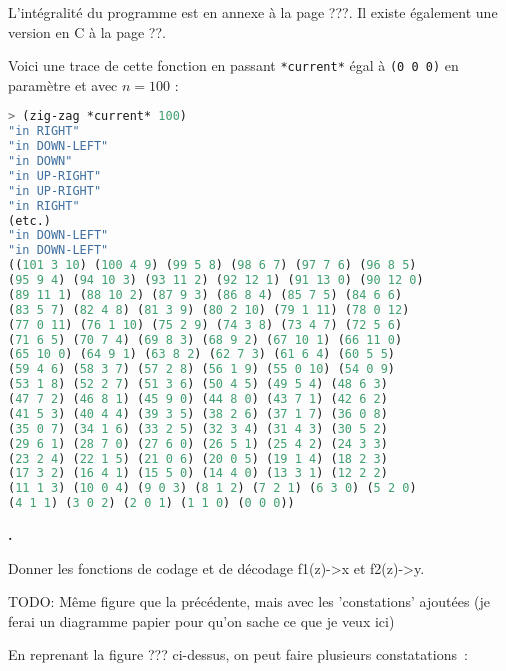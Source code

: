 \documentclass{article}
\newcounter{enoncecount}
\newenvironment{enonce}
{
\stepcounter{enoncecount}
\bf\small \arabic{enoncecount}.
\begin{bf}
}
{
\end{bf}
}
\begin{document}
L'intégralité du programme est en annexe à la page ???. Il existe également une version en C à la page ??.

Voici une trace de cette fonction en passant \lstinline!*current*! égal à \lstinline!(0 0 0)! en paramètre et avec $n = 100$ :

\begin{lstlisting}[language=Lisp]
> (zig-zag *current* 100)
"in RIGHT" 
"in DOWN-LEFT" 
"in DOWN" 
"in UP-RIGHT" 
"in UP-RIGHT" 
"in RIGHT" 
(etc.)
"in DOWN-LEFT" 
"in DOWN-LEFT" 
((101 3 10) (100 4 9) (99 5 8) (98 6 7) (97 7 6) (96 8 5) 
(95 9 4) (94 10 3) (93 11 2) (92 12 1) (91 13 0) (90 12 0) 
(89 11 1) (88 10 2) (87 9 3) (86 8 4) (85 7 5) (84 6 6) 
(83 5 7) (82 4 8) (81 3 9) (80 2 10) (79 1 11) (78 0 12) 
(77 0 11) (76 1 10) (75 2 9) (74 3 8) (73 4 7) (72 5 6) 
(71 6 5) (70 7 4) (69 8 3) (68 9 2) (67 10 1) (66 11 0) 
(65 10 0) (64 9 1) (63 8 2) (62 7 3) (61 6 4) (60 5 5) 
(59 4 6) (58 3 7) (57 2 8) (56 1 9) (55 0 10) (54 0 9) 
(53 1 8) (52 2 7) (51 3 6) (50 4 5) (49 5 4) (48 6 3) 
(47 7 2) (46 8 1) (45 9 0) (44 8 0) (43 7 1) (42 6 2) 
(41 5 3) (40 4 4) (39 3 5) (38 2 6) (37 1 7) (36 0 8) 
(35 0 7) (34 1 6) (33 2 5) (32 3 4) (31 4 3) (30 5 2) 
(29 6 1) (28 7 0) (27 6 0) (26 5 1) (25 4 2) (24 3 3) 
(23 2 4) (22 1 5) (21 0 6) (20 0 5) (19 1 4) (18 2 3) 
(17 3 2) (16 4 1) (15 5 0) (14 4 0) (13 3 1) (12 2 2) 
(11 1 3) (10 0 4) (9 0 3) (8 1 2) (7 2 1) (6 3 0) (5 2 0) 
(4 1 1) (3 0 2) (2 0 1) (1 1 0) (0 0 0))
\end{lstlisting}


\begin{enonce}
Donner les fonctions de codage et de décodage f1(z)->x et f2(z)->y.
\end{enonce}

TODO: Même figure que la précédente, mais avec les 'constations' ajoutées (je ferai un diagramme papier pour qu'on sache ce que je veux ici)

En reprenant la figure ??? ci-dessus, on peut faire plusieurs constatations~:
\end{document}

